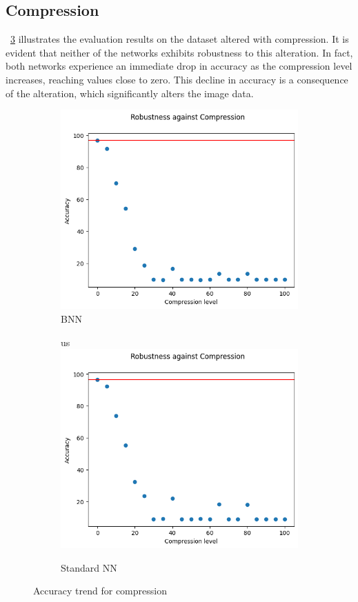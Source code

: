 \subsection{Compression}

\Fig~\ref{fig:acc_co_wu} illustrates the evaluation results on the dataset altered with compression. It is evident that neither of the networks exhibits robustness to this alteration. In fact, both networks experience an immediate drop in accuracy as the compression level increases, reaching values close to zero. This decline in accuracy is a consequence of the alteration, which significantly alters the image data.
\begin{figure}[h]
	\centering
	\begin{subfigure}{.5\textwidth}
		\centering
		\includegraphics[width=0.9\linewidth]{ImageFiles/EvalBNN/CO/WU/acc}
		\caption{BNN}
		\label{fig:co_acc_wu_bnn}
	\end{subfigure}%
	\begin{subfigure}{.5\textwidth}
		\centering
us		\includegraphics[width=0.9\linewidth]{ImageFiles/EvalANN/compr_ann}
		\caption{Standard NN}
		\label{fig:compr_ann}
	\end{subfigure}
	\caption{Accuracy trend for compression}
	\label{fig:acc_co_wu}
\end{figure}


